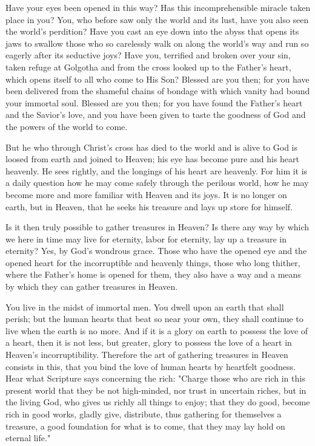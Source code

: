 Have your eyes been opened in this way? Has this incomprehensible miracle taken place in you? You, who before saw only the world and its lust, have you also seen the world’s perdition? Have you cast an eye down into the abyss that opens its jaws to swallow those who so carelessly walk on along the world’s way and run so eagerly after its seductive joys? Have you, terrified and broken over your sin, taken refuge at Golgotha and from the cross looked up to the Father’s heart, which opens itself to all who come to His Son? Blessed are you then; for you have been delivered from the shameful chains of bondage with which vanity had bound your immortal soul. Blessed are you then; for you have found the Father’s heart and the Savior’s love, and you have been given to taste the goodness of God and the powers of the world to come.

But he who through Christ’s cross has died to the world and is alive to God is loosed from earth and joined to Heaven; his eye has become pure and his heart heavenly. He sees rightly, and the longings of his heart are heavenly. For him it is a daily question how he may come safely through the perilous world, how he may become more and more familiar with Heaven and its joys. It is no longer on earth, but in Heaven, that he seeks his treasure and lays up store for himself.

Is it then truly possible to gather treasures in Heaven? Is there any way by which we here in time may live for eternity, labor for eternity, lay up a treasure in eternity? Yes, by God’s wondrous grace. Those who have the opened eye and the opened heart for the incorruptible and heavenly things, those who long thither, where the Father’s home is opened for them, they also have a way and a means by which they can gather treasures in Heaven.

You live in the midst of immortal men. You dwell upon an earth that shall perish; but the human hearts that beat so near your own, they shall continue to live when the earth is no more. And if it is a glory on earth to possess the love of a heart, then it is not less, but greater, glory to possess the love of a heart in Heaven’s incorruptibility. Therefore the art of gathering treasures in Heaven consists in this, that you bind the love of human hearts by heartfelt goodness. Hear what Scripture says concerning the rich: "Charge those who are rich in this present world that they be not high-minded, nor trust in uncertain riches, but in the living God, who gives us richly all things to enjoy; that they do good, become rich in good works, gladly give, distribute, thus gathering for themselves a treasure, a good foundation for what is to come, that they may lay hold on eternal life."

